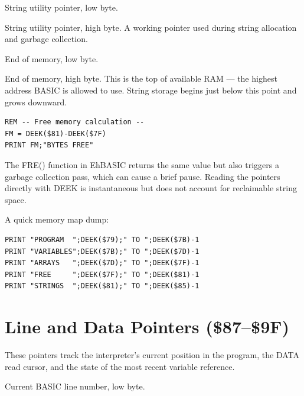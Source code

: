 String utility pointer, low byte.


String utility pointer, high byte.  A working pointer used during string
allocation and garbage collection.


End of memory, low byte.


End of memory, high byte.  This is the top of available RAM --- the highest
address BASIC is allowed to use.  String storage begins just below this point
and grows downward.

\begin{lstlisting}
REM -- Free memory calculation --
FM = DEEK($81)-DEEK($7F)
PRINT FM;"BYTES FREE"
\end{lstlisting}

\begin{notebox}
The FRE() function in EhBASIC returns the same value but also triggers a
garbage collection pass, which can cause a brief pause.  Reading the pointers
directly with DEEK is instantaneous but does not account for reclaimable
string space.
\end{notebox}

\begin{tipbox}
A quick memory map dump:
\begin{lstlisting}
PRINT "PROGRAM  ";DEEK($79);" TO ";DEEK($7B)-1
PRINT "VARIABLES";DEEK($7B);" TO ";DEEK($7D)-1
PRINT "ARRAYS   ";DEEK($7D);" TO ";DEEK($7F)-1
PRINT "FREE     ";DEEK($7F);" TO ";DEEK($81)-1
PRINT "STRINGS  ";DEEK($81);" TO ";DEEK($85)-1
\end{lstlisting}
\end{tipbox}

\section{Line and Data Pointers (\$87--\$9F)}

These pointers track the interpreter's current position in the program, the
DATA read cursor, and the state of the most recent variable reference.


Current BASIC line number, low byte.

